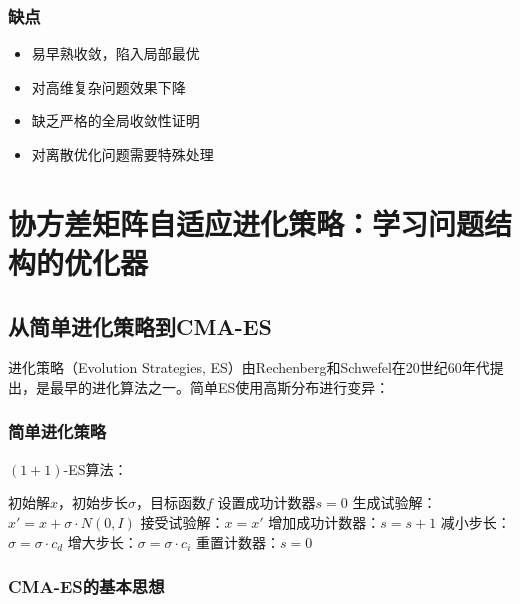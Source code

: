 \subsubsection{缺点}
\begin{itemize}
    \item 易早熟收敛，陷入局部最优
    \item 对高维复杂问题效果下降
    \item 缺乏严格的全局收敛性证明
    \item 对离散优化问题需要特殊处理
\end{itemize}

\section{协方差矩阵自适应进化策略：学习问题结构的优化器}

\subsection{从简单进化策略到CMA-ES}

进化策略（Evolution Strategies, ES）由Rechenberg和Schwefel在20世纪60年代提出，是最早的进化算法之一。简单ES使用高斯分布进行变异：

\subsubsection{简单进化策略}

$(1+1)$-ES算法：
\begin{algorithm}[H]
\caption{$(1+1)$-ES算法}
\begin{algorithmic}[1]
\REQUIRE 初始解$x$，初始步长$\sigma$，目标函数$f$
\STATE 设置成功计数器$s = 0$
    \STATE 生成试验解：$x' = x + \sigma \cdot N(0, I)$
        \STATE 接受试验解：$x = x'$
        \STATE 增加成功计数器：$s = s + 1$
    \ENDIF
            \STATE 减小步长：$\sigma = \sigma \cdot c_d$  
            \STATE 增大步长：$\sigma = \sigma \cdot c_i$  
        \ENDIF
        \STATE 重置计数器：$s = 0$
    \ENDIF
\ENDFOR
\end{algorithmic}
\end{algorithm}

\subsubsection{CMA-ES的基本思想}

